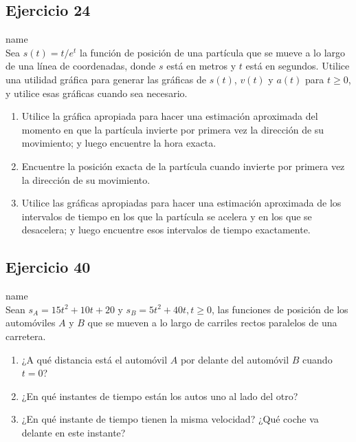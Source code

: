 \documentclass[12pt]{article}
\begin{document}
\subsection{Ejercicio 24} name \\

Sea $s(t) = t /e^t$ la función de posición de una partícula que se mueve a lo largo de una línea de coordenadas, donde $s$ está en metros y $t$ está en segundos. Utilice una utilidad gráfica para generar las gráficas de $s(t)$, $v(t)$ y $a(t)$ para $t \geq 0$, y utilice esas gráficas cuando sea necesario.
\begin{enumerate}[label=(\alph*)]
\item Utilice la gráfica apropiada para hacer una estimación aproximada del momento en que la partícula invierte por primera vez la dirección de su movimiento; y luego encuentre la hora exacta.
\item Encuentre la posición exacta de la partícula cuando invierte por primera vez la dirección de su movimiento.
\item Utilice las gráficas apropiadas para hacer una estimación aproximada de los intervalos de tiempo en los que la partícula se acelera y en los que se desacelera; y luego encuentre esos intervalos de tiempo exactamente.
\end{enumerate}
    
\subsection{Ejercicio 40} name \\

Sean $s_A = 15t^2 + 10t + 20$ y $s_B = 5t^2 + 40t, t \geq 0$, las funciones de posición de los automóviles $A$ y $B$ que se mueven a lo largo de carriles rectos paralelos de una carretera.

\begin{enumerate}[label=(\alph*)]
\item ¿A qué distancia está el automóvil $A$ por delante del automóvil $B$ cuando $t = 0$?
\item ¿En qué instantes de tiempo están los autos uno al lado del otro?
\item ¿En qué instante de tiempo tienen la misma velocidad? ¿Qué coche va delante en este instante?
\end{enumerate}

\end{document}
